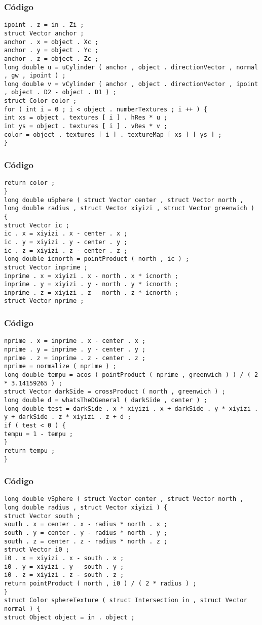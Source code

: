 \documentclass{beamer}
\begin{document}
\begin{frame}[fragile]
\frametitle{C\'odigo}
\begin{verbatim}
ipoint . z = in . Zi ; 
struct Vector anchor ; 
anchor . x = object . Xc ; 
anchor . y = object . Yc ; 
anchor . z = object . Zc ; 
long double u = uCylinder ( anchor , object . directionVector , normal , gw , ipoint ) ; 
long double v = vCylinder ( anchor , object . directionVector , ipoint , object . D2 - object . D1 ) ; 
struct Color color ; 
for ( int i = 0 ; i < object . numberTextures ; i ++ ) { 
int xs = object . textures [ i ] . hRes * u ; 
int ys = object . textures [ i ] . vRes * v ; 
color = object . textures [ i ] . textureMap [ xs ] [ ys ] ; 
} 
\end{verbatim}
\end{frame}
\begin{frame}[fragile]
\frametitle{C\'odigo}
\begin{verbatim}
return color ; 
} 
long double uSphere ( struct Vector center , struct Vector north , long double radius , struct Vector xiyizi , struct Vector greenwich ) { 
struct Vector ic ; 
ic . x = xiyizi . x - center . x ; 
ic . y = xiyizi . y - center . y ; 
ic . z = xiyizi . z - center . z ; 
long double icnorth = pointProduct ( north , ic ) ; 
struct Vector inprime ; 
inprime . x = xiyizi . x - north . x * icnorth ; 
inprime . y = xiyizi . y - north . y * icnorth ; 
inprime . z = xiyizi . z - north . z * icnorth ; 
struct Vector nprime ; 
\end{verbatim}
\end{frame}
\begin{frame}[fragile]
\frametitle{C\'odigo}
\begin{verbatim}
nprime . x = inprime . x - center . x ; 
nprime . y = inprime . y - center . y ; 
nprime . z = inprime . z - center . z ; 
nprime = normalize ( nprime ) ; 
long double tempu = acos ( pointProduct ( nprime , greenwich ) ) / ( 2 * 3.14159265 ) ; 
struct Vector darkSide = crossProduct ( north , greenwich ) ; 
long double d = whatsTheDGeneral ( darkSide , center ) ; 
long double test = darkSide . x * xiyizi . x + darkSide . y * xiyizi . y + darkSide . z * xiyizi . z + d ; 
if ( test < 0 ) { 
tempu = 1 - tempu ; 
} 
return tempu ; 
} 
\end{verbatim}
\end{frame}
\begin{frame}[fragile]
\frametitle{C\'odigo}
\begin{verbatim}
long double vSphere ( struct Vector center , struct Vector north , long double radius , struct Vector xiyizi ) { 
struct Vector south ; 
south . x = center . x - radius * north . x ; 
south . y = center . y - radius * north . y ; 
south . z = center . z - radius * north . z ; 
struct Vector i0 ; 
i0 . x = xiyizi . x - south . x ; 
i0 . y = xiyizi . y - south . y ; 
i0 . z = xiyizi . z - south . z ; 
return pointProduct ( north , i0 ) / ( 2 * radius ) ; 
} 
struct Color sphereTexture ( struct Intersection in , struct Vector normal ) { 
struct Object object = in . object ; 
\end{verbatim}
\end{frame}
\end{document}
